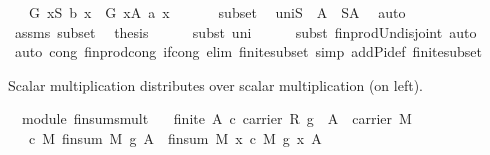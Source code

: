 \begin{isabellebody}
\ \ {\isacharparenleft}\ {\isachardoublequoteopen}{\isacharparenleft}{\isasymOtimes}\isactrlbsub G\isactrlesub \ x{\isasymin}S{\isachardot}\ {\isacharquery}b\ x{\isacharparenright}\ {\isacharequal}\ {\isacharparenleft}{\isasymOtimes}\isactrlbsub G\isactrlesub \ x{\isasymin}A{\isachardot}\ a\ x{\isacharparenright}{\isachardoublequoteclose}{\isacharparenright}\isanewline
%
\isadelimproof
%
\endisadelimproof
%
\isatagproof
{}\isamarkupfalse%
\ {\isacharminus}\ \isanewline
\ \ \isamarkupfalse%
\ subset\ \isamarkupfalse%
\ uni{\isacharcolon}{\isachardoublequoteopen}S\ {\isacharequal}\ A\ {\isasymunion}\ {\isacharparenleft}S{\isacharminus}A{\isacharparenright}{\isachardoublequoteclose}\ \isamarkupfalse%
\ auto\isanewline
\ \ \isamarkupfalse%
\ assms\ subset\ \isamarkupfalse%
\ {\isacharquery}thesis\isanewline
\ \ \ \ \isamarkupfalse%
\ {\isacharparenleft}subst\ uni{\isacharparenright}\isanewline
\ \ \ \ \isamarkupfalse%
\ {\isacharparenleft}subst\ finprod{\isacharunderscore}Un{\isacharunderscore}disjoint{\isacharcomma}\ auto{\isacharparenright}\isanewline
\ \ \ \ \isamarkupfalse%
\ {\isacharparenleft}auto\ cong{\isacharcolon}\ finprod{\isacharunderscore}cong\ if{\isacharunderscore}cong\ elim{\isacharcolon}\ finite{\isacharunderscore}subset\ simp\ add{\isacharcolon}Pi{\isacharunderscore}def\ finite{\isacharunderscore}subset{\isacharparenright}\isanewline
\isanewline
{}\isamarkupfalse%
%
\endisatagproof
{\isafoldproof}%
%
\isadelimproof
%
\endisadelimproof
%
\begin{isamarkuptext}%
Scalar multiplication distributes over scalar multiplication (on left).%
\end{isamarkuptext}%
\isamarkuptrue%
\isamarkupfalse%
\ {\isacharparenleft}\ module{\isacharparenright}\ finsum{\isacharunderscore}smult{\isacharcolon}\isanewline
\ \ {\isachardoublequoteopen}{\isacharbrackleft}{\isacharbar}\ finite\ A{\isacharsemicolon}\ c{\isasymin}\ carrier\ R{\isacharsemicolon}\ g\ {\isasymin}\ A\ {\isacharminus}{\isachargreater}\ carrier\ M\ {\isacharbar}{\isacharbrackright}\ {\isacharequal}{\isacharequal}{\isachargreater}\isanewline
\ \ \ {\isacharparenleft}c\ {\isasymodot}\isactrlbsub M\isactrlesub \ finsum\ M\ g\ A{\isacharparenright}\ {\isacharequal}\ finsum\ M\ {\isacharparenleft}{\isacharpercent}x{\isachardot}\ c\ {\isasymodot}\isactrlbsub M\isactrlesub \ g\ x{\isacharparenright}\ A\ {\isachardoublequoteclose}\isanewline

\end{isabellebody}
